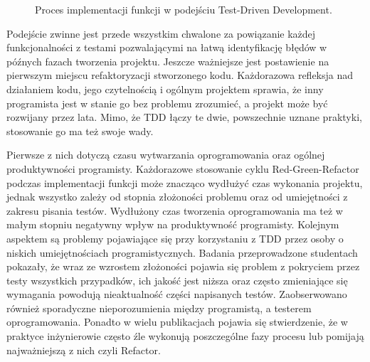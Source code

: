 \begin{figure}[h!]
	\caption{Proces implementacji funkcji w podejściu Test-Driven Development. }
	\centering
	\label{fig:TDD}
\end{figure}


Podejście zwinne jest przede wszystkim chwalone za powiązanie każdej
funkcjonalności z testami pozwalającymi na łatwą identyfikację błędów w późnych fazach
tworzenia projektu. Jeszcze ważniejsze jest postawienie na pierwszym miejscu refaktoryzacji
stworzonego kodu. Każdorazowa refleksja nad działaniem kodu, jego czytelnością i ogólnym
projektem sprawia, że inny programista jest w stanie go bez problemu zrozumieć, a projekt
może być rozwijany przez lata. Mimo, że TDD łączy te dwie, powszechnie uznane praktyki,
stosowanie go ma też swoje wady.


Pierwsze z nich dotyczą czasu wytwarzania oprogramowania oraz ogólnej
produktywności programisty. Każdorazowe stosowanie cyklu Red-Green-Refactor podczas
implementacji funkcji może znacząco wydłużyć czas wykonania projektu, jednak wszystko
zależy od stopnia złożoności problemu oraz od umiejętności z zakresu pisania testów\cite{TDD02}.
Wydłużony czas tworzenia oprogramowania ma też w małym stopniu negatywny wpływ na
produktywność programisty. Kolejnym aspektem są problemy pojawiające się przy
korzystaniu z TDD przez osoby o niskich umiejętnościach programistycznych. Badania
przeprowadzone studentach\cite{TDD01} pokazały, że wraz ze wzrostem złożoności pojawia się problem z
pokryciem przez testy wszystkich przypadków, ich jakość jest niższa oraz często zmieniające
się wymagania powodują nieaktualność części napisanych testów. Zaobserwowano również
sporadyczne nieporozumienia między programistą, a testerem oprogramowania. Ponadto w
wielu publikacjach pojawia się stwierdzenie, że w praktyce inżynierowie często źle
wykonują poszczególne fazy procesu lub pomijają najważniejszą z nich czyli Refactor.


